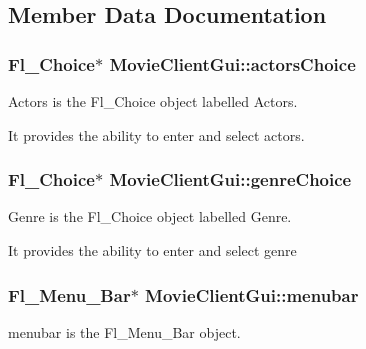 \subsection{Member Data Documentation}
\hypertarget{class_movie_client_gui_ad6d29ccb3c824b894638f2667cb1200d}{}
\subsubsection[{actors\+Choice}]{\setlength{\rightskip}{0pt plus 5cm}Fl\+\_\+\+Choice$\ast$ Movie\+Client\+Gui\+::actors\+Choice\hspace{0.3cm}{\ttfamily [protected]}}\label{class_movie_client_gui_ad6d29ccb3c824b894638f2667cb1200d}


Actors is the Fl\+\_\+\+Choice object labelled Actors. 

It provides the ability to enter and select actors. \hypertarget{class_movie_client_gui_adbe9044856cfbf73c9b2e5afd5292020}{}
\subsubsection[{genre\+Choice}]{\setlength{\rightskip}{0pt plus 5cm}Fl\+\_\+\+Choice$\ast$ Movie\+Client\+Gui\+::genre\+Choice\hspace{0.3cm}{\ttfamily [protected]}}\label{class_movie_client_gui_adbe9044856cfbf73c9b2e5afd5292020}


Genre is the Fl\+\_\+\+Choice object labelled Genre. 

It provides the ability to enter and select genre \hypertarget{class_movie_client_gui_a6b91d5aaf8cb97e4d8c6fee6013fa203}{}
\subsubsection[{menubar}]{\setlength{\rightskip}{0pt plus 5cm}Fl\+\_\+\+Menu\+\_\+\+Bar$\ast$ Movie\+Client\+Gui\+::menubar\hspace{0.3cm}{\ttfamily [protected]}}\label{class_movie_client_gui_a6b91d5aaf8cb97e4d8c6fee6013fa203}


menubar is the Fl\+\_\+\+Menu\+\_\+\+Bar object. 

